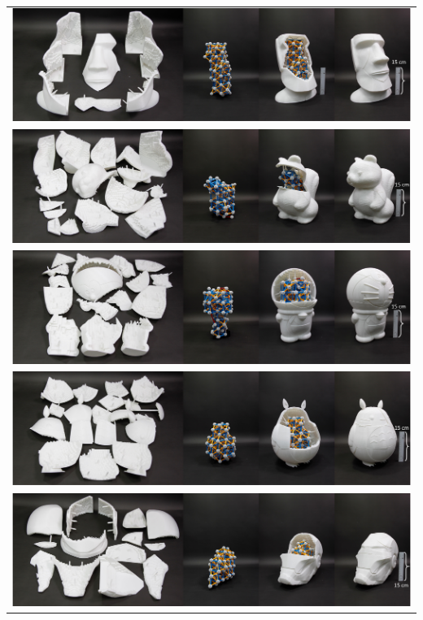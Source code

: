  \begin{table}[ht]
 \centering
 \resizebox{0.922\linewidth}{!} {
 \begin{tabular}{c} 
 \includegraphics{figs/MOAI_real.pdf} \\
 \includegraphics{figs/Squirrel_real.pdf}\\
 \includegraphics{figs/doraemon_real.pdf}\\
 \includegraphics{figs/totoro_real.pdf}\\
 \includegraphics{figs/iron_real.pdf}\\
 \end{tabular}
 }
 \caption{}
 \label{tab:result_ZomeFab_real}
 \end{table}

